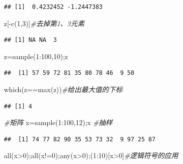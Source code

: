 \documentclass[
]{book}
\newenvironment{Shaded}{\begin{snugshade}}{\end{snugshade}}
\newcommand{\CommentTok}[1]{\textcolor[rgb]{0.56,0.35,0.01}{\textit{#1}}}
\newcommand{\DecValTok}[1]{\textcolor[rgb]{0.00,0.00,0.81}{#1}}
\newcommand{\FunctionTok}[1]{\textcolor[rgb]{0.00,0.00,0.00}{#1}}
\newcommand{\NormalTok}[1]{#1}
\newcommand{\OtherTok}[1]{\textcolor[rgb]{0.56,0.35,0.01}{#1}}
\newcommand{\SpecialCharTok}[1]{\textcolor[rgb]{0.00,0.00,0.00}{#1}}
\begin{document}
\begin{verbatim}
## [1]  0.4232452 -1.2447383
\end{verbatim}

\begin{Shaded}
\begin{Highlighting}[]
\NormalTok{z[}\SpecialCharTok{{-}}\FunctionTok{c}\NormalTok{(}\DecValTok{1}\NormalTok{,}\DecValTok{3}\NormalTok{)]}\CommentTok{\#去掉第1、3元素}
\end{Highlighting}
\end{Shaded}

\begin{verbatim}
## [1] NA NA  3
\end{verbatim}

\begin{Shaded}
\begin{Highlighting}[]
\NormalTok{z}\OtherTok{=}\FunctionTok{sample}\NormalTok{(}\DecValTok{1}\SpecialCharTok{:}\DecValTok{100}\NormalTok{,}\DecValTok{10}\NormalTok{);z}
\end{Highlighting}
\end{Shaded}

\begin{verbatim}
##  [1] 57 59 72 81 35 80 78 46  9 50
\end{verbatim}

\begin{Shaded}
\begin{Highlighting}[]
\FunctionTok{which}\NormalTok{(z}\SpecialCharTok{==}\FunctionTok{max}\NormalTok{(z))}\CommentTok{\#给出最大值的下标}
\end{Highlighting}
\end{Shaded}

\begin{verbatim}
## [1] 4
\end{verbatim}

\begin{Shaded}
\begin{Highlighting}[]
\CommentTok{\#矩阵}
\NormalTok{x}\OtherTok{=}\FunctionTok{sample}\NormalTok{(}\DecValTok{1}\SpecialCharTok{:}\DecValTok{100}\NormalTok{,}\DecValTok{12}\NormalTok{);x }\CommentTok{\#抽样}
\end{Highlighting}
\end{Shaded}

\begin{verbatim}
##  [1] 74 77 82 90 35 53 73 32  9 97 25 87
\end{verbatim}

\begin{Shaded}
\begin{Highlighting}[]
\FunctionTok{all}\NormalTok{(x}\SpecialCharTok{\textgreater{}}\DecValTok{0}\NormalTok{);}\FunctionTok{all}\NormalTok{(x}\SpecialCharTok{!=}\DecValTok{0}\NormalTok{);}\FunctionTok{any}\NormalTok{(x}\SpecialCharTok{\textgreater{}}\DecValTok{0}\NormalTok{);(}\DecValTok{1}\SpecialCharTok{:}\DecValTok{10}\NormalTok{)[x}\SpecialCharTok{\textgreater{}}\DecValTok{0}\NormalTok{]}\CommentTok{\#逻辑符号的应用}
\end{Highlighting}
\end{Shaded}
\end{document}
